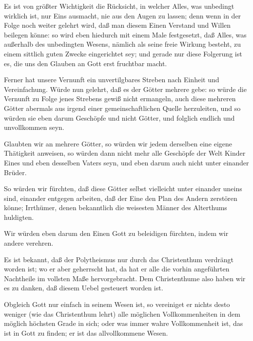 \begin{aufza}
\item Es ist von größter Wichtigkeit die Rücksicht, in welcher Alles, was unbedingt wirklich ist, nur Eins ausmacht, nie aus den Augen zu lassen; denn wenn in der Folge noch weiter gelehrt wird, daß man diesem Einen Verstand und Willen beilegen könne: so wird eben hiedurch mit einem Male festgesetzt, daß Alles, was außerhalb des unbedingten Wesens, nämlich als seine freie Wirkung besteht, zu einem sittlich guten Zwecke eingerichtet sey; und gerade nur diese Folgerung ist es, die uns den Glauben an Gott erst fruchtbar macht.
\item Ferner hat unsere Vernunft ein unvertilgbares Streben nach Einheit und Vereinfachung. Würde nun gelehrt, daß es der Götter mehrere gebe: so würde die Vernunft zu Folge jenes Strebens gewiß nicht ermangeln, auch diese mehreren Götter abermals aus irgend einer gemeinschaftlichen Quelle herzuleiten, und so würden sie eben darum Geschöpfe und nicht Götter, und folglich endlich und unvollkommen seyn.
\item Glaubten wir an mehrere Götter, so würden wir jedem derselben eine eigene Thätigkeit anweisen, so würden dann nicht mehr alle Geschöpfe der Welt Kinder Eines und eben desselben Vaters seyn, und eben darum auch nicht unter einander Brüder.
\item So würden wir fürchten, daß diese Götter selbst vielleicht unter einander uneins sind, einander entgegen arbeiten, daß der Eine den Plan des Andern zerstören könne; Irrthümer, denen bekanntlich die weisesten Männer des Alterthums huldigten.
\item Wir würden eben darum den Einen Gott zu beleidigen fürchten, indem wir andere verehren. \Usw~
\end{aufza}

Es ist bekannt, daß der Polytheismus nur durch das Christenthum verdrängt worden ist; wo er aber geherrscht hat, da hat er alle die vorhin angeführten Nachtheile im vollsten Maße hervorgebracht. Dem Christenthume also haben wir es zu danken, daß diesem Uebel gesteuert worden ist.

Obgleich Gott nur einfach in seinem Wesen ist, so vereiniget er nichts desto weniger (wie das Christenthum lehrt) alle möglichen Vollkommenheiten in dem möglich höchsten Grade in sich; oder was immer wahre Vollkommenheit ist, das ist in Gott zu finden; er ist das allvollkommene Wesen.

